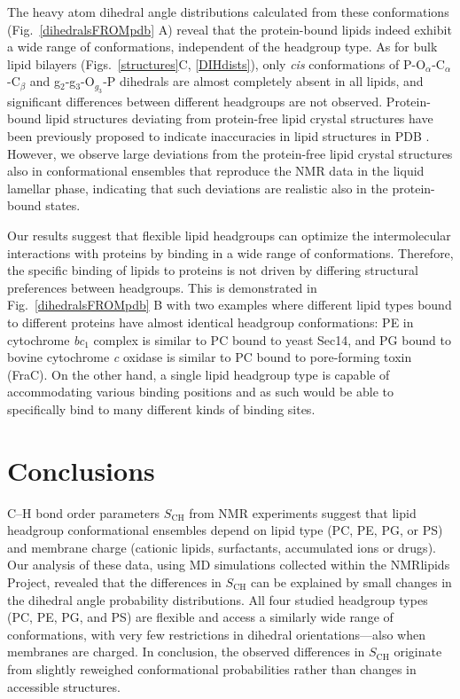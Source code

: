 \documentclass[journal=jpcbfk,manuscript=article]{achemso}
\begin{document}
The heavy atom dihedral angle distributions calculated from these conformations 
(Fig.~\ref{dihedralsFROMpdb} A) reveal that the protein-bound lipids indeed exhibit a wide
range of conformations, independent of the headgroup type.
As for bulk lipid bilayers (Figs.~\ref{structures}C, \ref{DIHdists}), only {\it cis} conformations
of P-O$_\alpha$-C$_\alpha$-C$_\beta$ and g$_2$-g$_3$-O$_{g_3}$-P dihedrals are almost
completely absent in all lipids, and significant differences between
different headgroups are not observed.
Protein-bound lipid structures deviating from protein-free lipid crystal structures 
have been previously proposed to indicate inaccuracies in lipid structures in PDB \cite{marsh13b,pezeshkian18}. 
However, we observe large deviations from the protein-free lipid crystal structures also in conformational ensembles
that reproduce the NMR data in the liquid lamellar phase, indicating that such deviations
are realistic also in the protein-bound states.


Our results suggest that flexible lipid headgroups can optimize the intermolecular interactions with proteins by binding
in a wide range of conformations.
Therefore, the specific binding of lipids to proteins is not driven by differing structural preferences between headgroups.
This is demonstrated in Fig.~\ref{dihedralsFROMpdb} B with two examples where different lipid types bound to
different proteins have almost identical headgroup conformations:
PE in cytochrome {\it bc}$_1$ complex is similar to PC bound to yeast Sec14,
and PG bound to bovine cytochrome {\it c} oxidase is similar to PC bound to pore-forming toxin (FraC).
On the other hand, a single lipid headgroup type is capable of accommodating various binding positions and as such would 
be able to specifically bind to many different kinds of binding sites.


\section{Conclusions}

C--H bond order parameters $S_\mathrm{CH}$ from NMR experiments 
suggest that lipid headgroup conformational ensembles depend on lipid type (PC, PE, PG, or PS) 
and membrane charge (cationic lipids, surfactants, accumulated ions or drugs). 
Our analysis of these data, using MD simulations collected
within the NMRlipids Project,
revealed that the differences in $S_\mathrm{CH}$ can be explained
by small changes in the dihedral angle probability distributions.
All four studied headgroup types (PC, PE, PG, and PS) are flexible
and access a similarly wide range of conformations, with very few restrictions in dihedral orientations---also when membranes are charged.
In conclusion, the observed differences in $S_\mathrm{CH}$ originate from
slightly reweighed conformational probabilities rather than changes in accessible structures.
\end{document}
